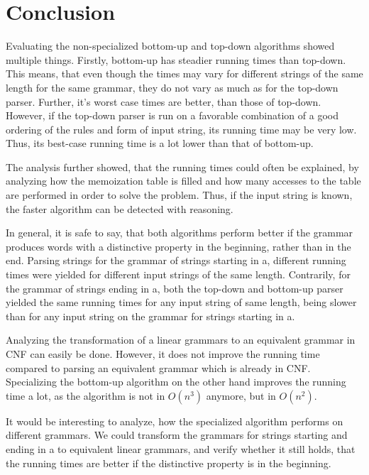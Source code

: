 \newpage
\section{Conclusion}

Evaluating the non-specialized bottom-up and top-down algorithms showed multiple things.
Firstly, bottom-up has steadier running times than top-down.
This means, that even though the times may vary for different strings of the same length for the same grammar, they do not vary as much as for the top-down parser.
Further, it's worst case times are better, than those of top-down.
However, if the top-down parser is run on a favorable combination of a good ordering of the rules and form of input string, its running time may be very low.
Thus, its best-case running time is a lot lower than that of bottom-up.

The analysis further showed, that the running times could often be explained, by analyzing how the memoization table is filled and how many accesses to the table are performed in order to solve the problem.
Thus, if the input string is known, the faster algorithm can be detected with reasoning.

In general, it is safe to say, that both algorithms perform better if the grammar produces words with a distinctive property in the beginning, rather than in the end.
Parsing strings for the grammar of strings starting in a, different running times were yielded for different input strings of the same length.
Contrarily, for the grammar of strings ending in a, both the top-down and bottom-up parser yielded the same running times for any input string of same length, being slower than for any input string on the grammar for strings starting in a.

Analyzing the transformation of a linear grammars to an equivalent grammar in CNF can easily be done.
However, it does not improve the running time compared to parsing an equivalent grammar which is already in CNF.
Specializing the bottom-up algorithm on the other hand improves the running time a lot, as the algorithm is not in $O(n^3)$ anymore, but in $O(n^2)$.

It would be interesting to analyze, how the specialized algorithm performs on different grammars.
We could transform the grammars for strings starting and ending in a to equivalent linear grammars, and verify whether it still holds, that the running times are better if the distinctive property is in the beginning.
